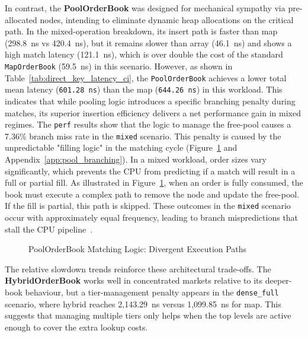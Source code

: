 In contrast, the \textbf{PoolOrderBook} was designed for mechanical sympathy via
pre-allocated nodes, intending to eliminate dynamic heap allocations on the critical path.
In the mixed-operation breakdown, its insert path is faster than map
(298.8~ns vs 420.4~ns), but it remains slower than array (46.1~ns) and shows a
high match latency (121.1~ns), which is over double the cost of the 
standard \texttt{MapOrderBook} (59.5~ns) in this scenario. 
However, as shown in Table~\ref{tab:direct_key_latency_ci}, the \texttt{PoolOrderBook}
achieves a lower total mean latency (\texttt{601.28~ns}) than the map (\texttt{644.26~ns}) 
in this workload. This indicates that while pooling logic introduces a specific branching penalty during matches,
its superior insertion efficiency delivers a net performance gain in mixed regimes.
The \texttt{perf} results show that the logic to manage the free-pool causes a 
7.36\% branch miss rate in the \texttt{mixed} scenario. This penalty is caused 
by the unpredictable "filling logic" in the matching cycle 
(Figure~\ref{fig:pool_match_flow} and Appendix~\ref{app:pool_branching}). 
In a mixed workload, order sizes vary significantly, which prevents the CPU 
from predicting if a match will result in a full or partial fill. As 
illustrated in Figure~\ref{fig:pool_match_flow}, when an order is fully 
consumed, the book must execute a complex path to remove the node and update 
the free-pool. If the fill is partial, this path is skipped. These outcomes in 
the \texttt{mixed} scenario occur with approximately equal frequency, leading 
to branch mispredictions that stall the CPU pipeline~\citep{patterson2013cod}.

\begin{figure}[htbp]
    \centering
    \resizebox{0.92\textwidth}{!}{}
    \caption{PoolOrderBook Matching Logic: Divergent Execution Paths}
    \label{fig:pool_match_flow}
\end{figure}

The relative slowdown trends reinforce these architectural trade-offs. 
The \textbf{HybridOrderBook} works well in concentrated markets relative to its
deeper-book behaviour, but a tier-management penalty appears in the
\texttt{dense\_full} scenario, where hybrid reaches 2,143.29~ns versus
1,099.85~ns for map. This suggests that managing multiple 
tiers only helps when the top levels are active enough to cover the extra lookup 
costs.


